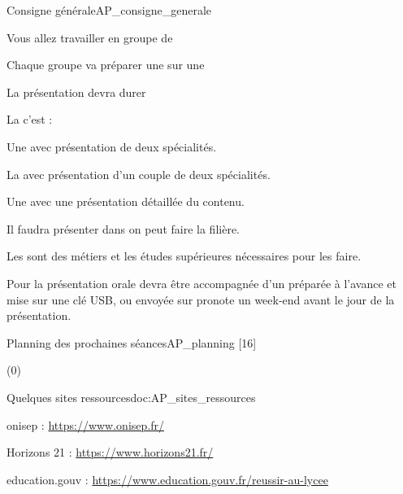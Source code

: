 \teteSndAP
{}

\begin{doc}{Consigne générale}{AP_consigne_generale}
  \begin{listePoints}
    \item Vous allez travailler en groupe de 
    \item Chaque groupe va préparer une  sur une 
    \item La présentation devra durer 
    \item La  c'est :
    \begin{listePoints}
      \item Une  avec présentation de deux spécialités.
      \item La  avec présentation d'un couple de deux spécialités.
      \item Une  avec une présentation détaillée du contenu.
    \end{listePoints}
    \item Il faudra présenter dans  on peut faire la filière.
    \item Les  sont des métiers et les études supérieures nécessaires pour les faire.
  \end{listePoints}

  Pour la présentation orale devra être accompagnée d'un  préparée à l'avance et mise sur une clé USB, ou envoyée sur pronote un week-end avant le jour de la présentation.
\end{doc}

\begin{doc}{Planning des prochaines séances}{AP_planning}
  [16]
  \vspace*{-218 pt}
  
  \begin{programmeSeance}[2]
  \end{programmeSeance}
  \begin{programmeSeance}[2](0)
  \end{programmeSeance}
\end{doc}

\begin{doc}{Quelques sites ressources}{doc:AP_sites_ressources}
  \begin{listePoints}
    \item onisep : \url{https://www.onisep.fr/}  
    
    \item Horizons 21 : \url{https://www.horizons21.fr/}
    \item education.gouv : \url{https://www.education.gouv.fr/reussir-au-lycee}
  \end{listePoints}
\end{doc}